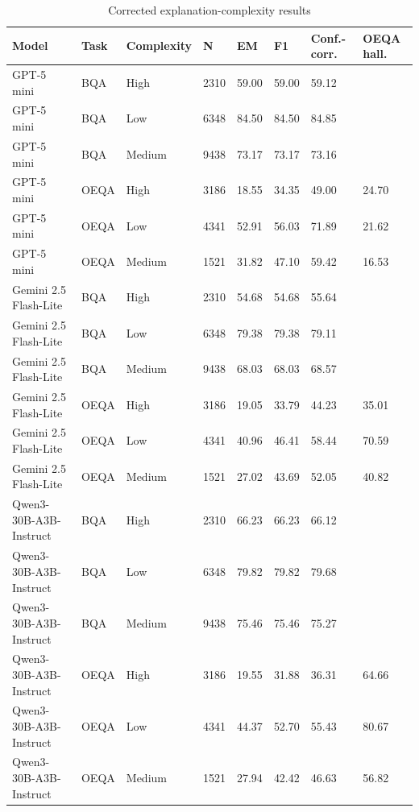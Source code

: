 \begin{table}[t]
\centering
\small
\begin{tabular}{llllllll}
\toprule
Model & Task & Complexity & N & EM & F1 & Conf.-corr. & OEQA hall. \\
\midrule
GPT-5 mini & BQA & High & 2310 & 59.00 & 59.00 & 59.12 &  \\
GPT-5 mini & BQA & Low & 6348 & 84.50 & 84.50 & 84.85 &  \\
GPT-5 mini & BQA & Medium & 9438 & 73.17 & 73.17 & 73.16 &  \\
GPT-5 mini & OEQA & High & 3186 & 18.55 & 34.35 & 49.00 & 24.70 \\
GPT-5 mini & OEQA & Low & 4341 & 52.91 & 56.03 & 71.89 & 21.62 \\
GPT-5 mini & OEQA & Medium & 1521 & 31.82 & 47.10 & 59.42 & 16.53 \\
Gemini 2.5 Flash-Lite & BQA & High & 2310 & 54.68 & 54.68 & 55.64 &  \\
Gemini 2.5 Flash-Lite & BQA & Low & 6348 & 79.38 & 79.38 & 79.11 &  \\
Gemini 2.5 Flash-Lite & BQA & Medium & 9438 & 68.03 & 68.03 & 68.57 &  \\
Gemini 2.5 Flash-Lite & OEQA & High & 3186 & 19.05 & 33.79 & 44.23 & 35.01 \\
Gemini 2.5 Flash-Lite & OEQA & Low & 4341 & 40.96 & 46.41 & 58.44 & 70.59 \\
Gemini 2.5 Flash-Lite & OEQA & Medium & 1521 & 27.02 & 43.69 & 52.05 & 40.82 \\
Qwen3-30B-A3B-Instruct & BQA & High & 2310 & 66.23 & 66.23 & 66.12 &  \\
Qwen3-30B-A3B-Instruct & BQA & Low & 6348 & 79.82 & 79.82 & 79.68 &  \\
Qwen3-30B-A3B-Instruct & BQA & Medium & 9438 & 75.46 & 75.46 & 75.27 &  \\
Qwen3-30B-A3B-Instruct & OEQA & High & 3186 & 19.55 & 31.88 & 36.31 & 64.66 \\
Qwen3-30B-A3B-Instruct & OEQA & Low & 4341 & 44.37 & 52.70 & 55.43 & 80.67 \\
Qwen3-30B-A3B-Instruct & OEQA & Medium & 1521 & 27.94 & 42.42 & 46.63 & 56.82 \\
\bottomrule
\end{tabular}
\caption{Corrected explanation-complexity results}
\label{tab:core-v11-corrected-explanation-complexity}
\end{table}
